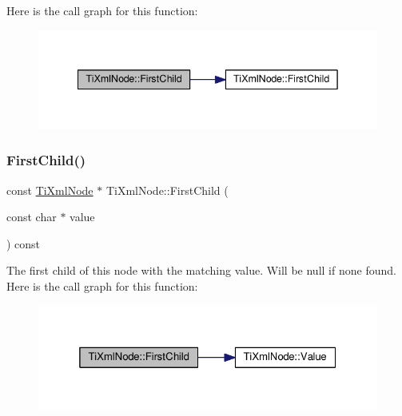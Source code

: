 Here is the call graph for this function\+:
\nopagebreak
\begin{figure}[H]
\begin{center}
\leavevmode
\includegraphics[width=342pt]{class_ti_xml_node_a5e97d69b7c0ebd27fb7286be56559b77_cgraph}
\end{center}
\end{figure}
\mbox{\label{class_ti_xml_node_ae98c367f664890c4b5a5183481ec128a}} 
\subsubsection{\texorpdfstring{First\+Child()}{FirstChild()}\hspace{0.1cm}{\footnotesize\ttfamily [3/4]}}
{\footnotesize\ttfamily const \hyperlink{class_ti_xml_node}{Ti\+Xml\+Node} $\ast$ Ti\+Xml\+Node\+::\+First\+Child (\begin{DoxyParamCaption}\item[{const char $\ast$}]{value }\end{DoxyParamCaption}) const}

The first child of this node with the matching \textquotesingle{}value\textquotesingle{}. Will be null if none found. Here is the call graph for this function\+:
\nopagebreak
\begin{figure}[H]
\begin{center}
\leavevmode
\includegraphics[width=325pt]{class_ti_xml_node_ae98c367f664890c4b5a5183481ec128a_cgraph}
\end{center}
\end{figure}
\mbox{\label{class_ti_xml_node_abc8bf32be6419ec453a731868de19554}} 
